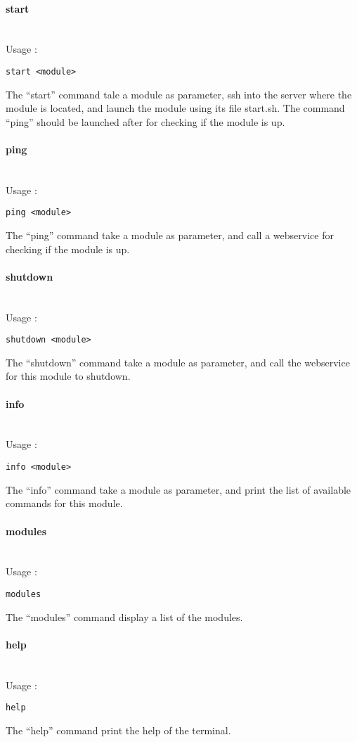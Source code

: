 \paragraph{start} \hspace{0pt} \\
Usage :
\begin{verbatim}
start <module>
\end{verbatim}
The ``start'' command tale a module as parameter, ssh into the server where the module is located, and launch the module using its file start.sh. The command ``ping'' should be launched after for checking if the module is up.

\paragraph{ping} \hspace{0pt} \\
Usage :
\begin{verbatim}
ping <module>
\end{verbatim}
The ``ping'' command take a module as parameter, and call a webservice for checking if the module is up.

\paragraph{shutdown} \hspace{0pt} \\
Usage :
\begin{verbatim}
shutdown <module>
\end{verbatim}
The ``shutdown'' command take a module as parameter, and call the webservice for this module to shutdown.

\paragraph{info} \hspace{0pt} \\
Usage :
\begin{verbatim}
info <module>
\end{verbatim}
The ``info'' command take a module as parameter, and print the list of available commands for this module.

\paragraph{modules} \hspace{0pt} \\
Usage :
\begin{verbatim}
modules
\end{verbatim}
The ``modules'' command display a list of the modules.

\paragraph{help} \hspace{0pt} \\
Usage :
\begin{verbatim}
help
\end{verbatim}
The ``help'' command print the help of the terminal.
